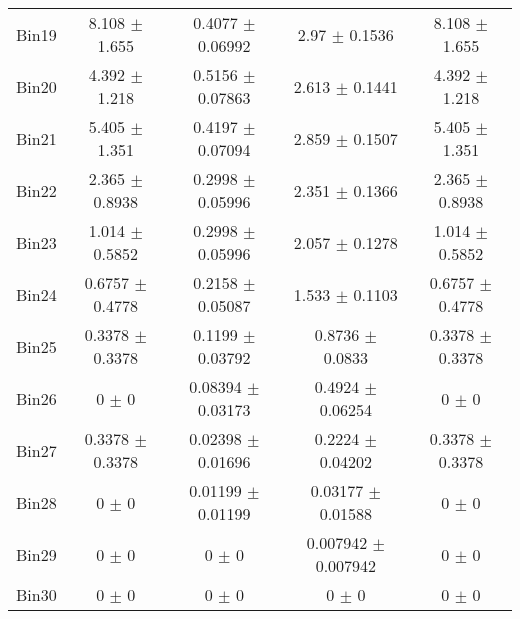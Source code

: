 \begin{tabular}{@{\extracolsep{4pt}}lcccc@{}}
     Bin19 & 8.108 $\pm$ 1.655 & 0.4077 $\pm$ 0.06992 & 2.97 $\pm$ 0.1536 & 8.108 $\pm$ 1.655 \\ 
     Bin20 & 4.392 $\pm$ 1.218 & 0.5156 $\pm$ 0.07863 & 2.613 $\pm$ 0.1441 & 4.392 $\pm$ 1.218 \\ 
     Bin21 & 5.405 $\pm$ 1.351 & 0.4197 $\pm$ 0.07094 & 2.859 $\pm$ 0.1507 & 5.405 $\pm$ 1.351 \\ 
     Bin22 & 2.365 $\pm$ 0.8938 & 0.2998 $\pm$ 0.05996 & 2.351 $\pm$ 0.1366 & 2.365 $\pm$ 0.8938 \\ 
     Bin23 & 1.014 $\pm$ 0.5852 & 0.2998 $\pm$ 0.05996 & 2.057 $\pm$ 0.1278 & 1.014 $\pm$ 0.5852 \\ 
     Bin24 & 0.6757 $\pm$ 0.4778 & 0.2158 $\pm$ 0.05087 & 1.533 $\pm$ 0.1103 & 0.6757 $\pm$ 0.4778 \\ 
     Bin25 & 0.3378 $\pm$ 0.3378 & 0.1199 $\pm$ 0.03792 & 0.8736 $\pm$ 0.0833 & 0.3378 $\pm$ 0.3378 \\ 
     Bin26 & 0 $\pm$ 0 & 0.08394 $\pm$ 0.03173 & 0.4924 $\pm$ 0.06254 & 0 $\pm$ 0 \\ 
     Bin27 & 0.3378 $\pm$ 0.3378 & 0.02398 $\pm$ 0.01696 & 0.2224 $\pm$ 0.04202 & 0.3378 $\pm$ 0.3378 \\ 
     Bin28 & 0 $\pm$ 0 & 0.01199 $\pm$ 0.01199 & 0.03177 $\pm$ 0.01588 & 0 $\pm$ 0 \\ 
     Bin29 & 0 $\pm$ 0 & 0 $\pm$ 0 & 0.007942 $\pm$ 0.007942 & 0 $\pm$ 0 \\ 
     Bin30 & 0 $\pm$ 0 & 0 $\pm$ 0 & 0 $\pm$ 0 & 0 $\pm$ 0 \\ 
\hline\hline
  \end{tabular}
